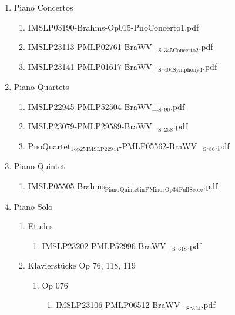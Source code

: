 \documentclass[11pt]{article}
\begin{document}
\begin{enumerate}
\item Piano Concertos
\label{sec-1-1-1-1-44-15-6}
\begin{enumerate}
\item IMSLP03190-Brahms-Op015-PnoConcerto1.pdf
\label{sec-1-1-1-1-44-15-6-1}

\item IMSLP23113-PMLP02761-BraWV\_$_{\text{S}}$.$_{\text{345Concerto2}}$.pdf
\label{sec-1-1-1-1-44-15-6-2}

\item IMSLP23141-PMLP01617-BraWV\_$_{\text{S}}$.$_{\text{404Symphony4}}$.pdf
\label{sec-1-1-1-1-44-15-6-3}
\end{enumerate}

\item Piano Quartets
\label{sec-1-1-1-1-44-15-7}
\begin{enumerate}
\item IMSLP22945-PMLP52504-BraWV\_$_{\text{S}}$.$_{\text{90}}$.pdf
\label{sec-1-1-1-1-44-15-7-1}

\item IMSLP23079-PMLP29589-BraWV\_$_{\text{S}}$.$_{\text{258}}$.pdf
\label{sec-1-1-1-1-44-15-7-2}

\item PnoQuartet$_{\text{1}}$$_{\text{op25}}$$_{\text{IMSLP22944}}$-PMLP05562-BraWV\_$_{\text{S}}$.$_{\text{86}}$.pdf
\label{sec-1-1-1-1-44-15-7-3}
\end{enumerate}

\item Piano Quintet
\label{sec-1-1-1-1-44-15-8}
\begin{enumerate}
\item IMSLP05505-Brahms$_{\text{Piano}}$$_{\text{Quintet}}$$_{\text{in}}$$_{\text{F}}$$_{\text{Minor}}$$_{\text{Op34}}$$_{\text{Full}}$$_{\text{Score}}$.pdf
\label{sec-1-1-1-1-44-15-8-1}
\end{enumerate}

\item Piano Solo
\label{sec-1-1-1-1-44-15-9}
\begin{enumerate}
\item Etudes
\label{sec-1-1-1-1-44-15-9-1}
\begin{enumerate}
\item IMSLP23202-PMLP52996-BraWV\_$_{\text{S}}$.$_{\text{618}}$.pdf
\label{sec-1-1-1-1-44-15-9-1-1}
\end{enumerate}

\item Klavierstücke Op 76, 118, 119
\label{sec-1-1-1-1-44-15-9-2}
\begin{enumerate}
\item Op 076
\label{sec-1-1-1-1-44-15-9-2-1}
\begin{enumerate}
\item IMSLP23106-PMLP06512-BraWV\_$_{\text{S}}$.$_{\text{324}}$.pdf
\label{sec-1-1-1-1-44-15-9-2-1-1}
\end{enumerate}


\end{enumerate}
\end{enumerate}
\end{enumerate}
\end{document}
